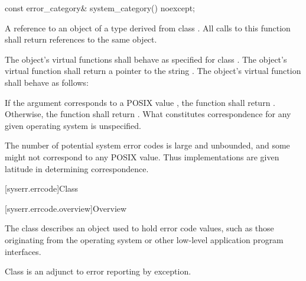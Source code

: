 %
\begin{itemdecl}
const error_category& system_category() noexcept;
\end{itemdecl}

\begin{itemdescr}
\pnum
\returns
A reference to an object of a type derived from class .
All calls to this function shall return references to the same object.

\pnum
\remarks
The object's  virtual functions shall behave as specified for
class . The object's  virtual function shall return a
pointer to the string . The object's 
virtual function shall behave as follows:

If the argument  corresponds to a POSIX  value , the
function shall return .
Otherwise, the function shall return . What constitutes correspondence for any given operating
system is unspecified.
\begin{note}
The number of potential system error codes is large
and unbounded, and some might not correspond to any POSIX  value. Thus
implementations are given latitude in determining correspondence.
\end{note}
\end{itemdescr}

[syserr.errcode]{Class }

[syserr.errcode.overview]{Overview}

\pnum
The class  describes an object used to hold error code
values, such as those originating from the operating system or other low-level
application program interfaces.
\begin{note}
Class  is an
adjunct to error reporting by exception.
\end{note}

